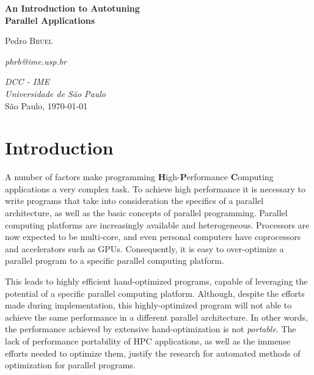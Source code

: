 \documentclass[a4paper, 12pt]{article}
\begin{document}
\hypersetup{backref,pdfpagemode=FullScreen,colorlinks=true}

\thispagestyle{empty}
\begin{center}
    \vspace*{4cm}
    \textbf{\Large{An Introduction to Autotuning\\Parallel Applications}}\\

    \vskip 1cm

    Pedro \textsc{Bruel}

    \emph{phrb@ime.usp.br}

    \vfill
    \normalsize{\emph{DCC - IME\\
    Universidade de São Paulo}\\}
    \normalsize{São Paulo, \today}
\end{center}

\newpage

\tableofcontents

\newpage

\section{Introduction} \label{sec:intro}

A number of factors make programming \textbf{H}igh-\textbf{P}erformance
\textbf{C}omputing applications a very complex task. To achieve high
performance it is necessary to write programs that take into consideration
the specifics of a parallel architecture, as well as the basic concepts
of parallel programming. Parallel computing platforms are increasingly
available and heterogeneous. Processors are now expected to be multi-core,
and even personal computers have coprocessors and accelerators such as
GPUs. Consequently, it is easy to over-optimize a parallel program to
a specific parallel computing platform.

This leads to highly efficient hand-optimized programs, capable of leveraging
the potential of a specific parallel computing platform. Although, despite the
efforts made during implementation, this highly-optimized program will not able
to achieve the same performance in a different parallel architecture. In other
words, the performance achieved by extensive hand-optimization is
not \emph{portable}. The lack of performance portability of HPC applications,
as well as the immense efforts needed to optimize them, justify the research
for automated methods of optimization for parallel programs.
\end{document}
